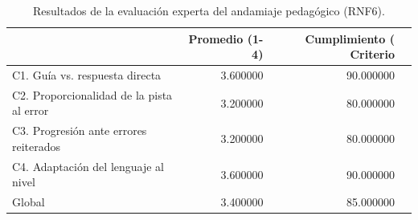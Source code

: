 \begin{table}
\caption{Resultados de la evaluación experta del andamiaje pedagógico (RNF6).}
\label{table:rubric-results}
\begin{tabular}{lrr}
\toprule
 & Promedio (1-4) & Cumplimiento (%
Criterio &  &  \\
\midrule
C1. Guía vs. respuesta directa & 3.600000 & 90.000000 \\
C2. Proporcionalidad de la pista al error & 3.200000 & 80.000000 \\
C3. Progresión ante errores reiterados & 3.200000 & 80.000000 \\
C4. Adaptación del lenguaje al nivel & 3.600000 & 90.000000 \\
Global & 3.400000 & 85.000000 \\
\bottomrule
\end{tabular}
\end{table}
